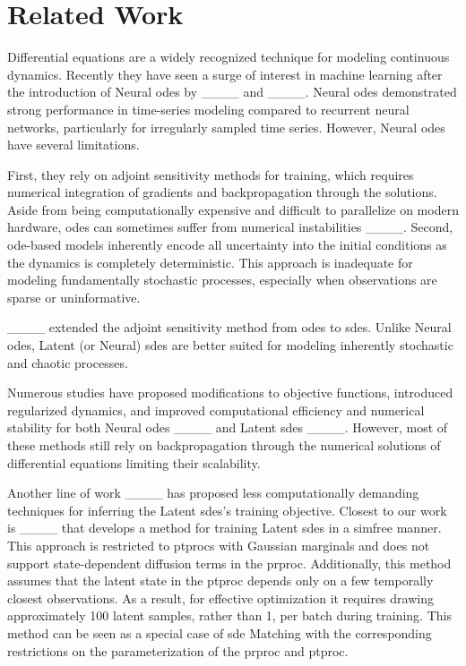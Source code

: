 \section{Related Work}
\label{sec:related_work}


Differential equations are a widely recognized technique for modeling continuous dynamics. Recently they have seen a surge of interest in machine learning after the introduction of Neural \glspl{ode} by ____ and ____. Neural \glspl{ode} demonstrated strong performance in time-series modeling compared to recurrent neural networks, particularly for irregularly sampled time series. However, Neural \glspl{ode} have several limitations.


First, they rely on adjoint sensitivity methods for training, which requires numerical integration of gradients and backpropagation through the solutions. Aside from being computationally expensive and difficult to parallelize on modern hardware, \glspl{ode} can sometimes suffer from numerical instabilities ____. Second, \gls{ode}-based models inherently encode all uncertainty into the initial conditions as the dynamics is completely deterministic. This approach is inadequate for modeling fundamentally stochastic processes, especially when observations are sparse or uninformative.


____ extended the adjoint sensitivity method from \glspl{ode} to \glspl{sde}. Unlike Neural \glspl{ode}, Latent (or Neural) \glspl{sde} are better suited for modeling inherently stochastic and chaotic processes.


Numerous studies have proposed modifications to objective functions, introduced regularized dynamics, and improved computational efficiency and numerical stability for both Neural \glspl{ode} ____ and Latent \glspl{sde} ____. However, most of these methods still rely on backpropagation through the numerical solutions of differential equations limiting their scalability.


Another line of work ____ has proposed less computationally demanding techniques for inferring the Latent \glspl{sde}'s training objective. Closest to our work is ____ that develops a method for training Latent \glspl{sde} in a \gls{simfree} manner. This approach is restricted to \glspl{ptproc} with Gaussian marginals and does not support state-dependent diffusion terms in the \gls{prproc}. Additionally, this method assumes that the latent state in the \gls{ptproc} depends only on a few temporally closest observations. As a result, for effective optimization it requires drawing approximately 100 latent samples,  rather than 1, per batch during training. This method can be seen as a special case of \gls{sde} Matching with the corresponding restrictions on the parameterization of the \gls{prproc} and \gls{ptproc}.


